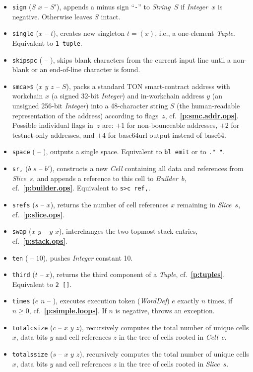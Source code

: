 \documentclass[12pt,oneside]{article}
\def\refpoint#1{{\rm\textbf{\ref{#1}}}}
\let\ptref=\refpoint
\begin{document}
\begin{itemize}
\item {\tt sign} ($S$ $x$ -- $S'$), appends a minus sign ``{\tt -}'' to {\em String\/}~$S$ if {\em Integer\/}~$x$ is negative. Otherwise leaves $S$ intact.
\item {\tt single} ($x$ -- $t$), creates new singleton $t=(x)$, i.e., a one-element {\em Tuple}. Equivalent to {\tt 1 tuple}.
\item {\tt skipspc} ( -- ), skips blank characters from the current input line until a non-blank or an end-of-line character is found.
\item {\tt smca>\$} ($x$ $y$ $z$ -- $S$), packs a standard TON smart-contract address with workchain $x$ (a signed 32-bit {\em Integer\/}) and in-workchain address $y$ (an unsigned 256-bit {\em Integer\/}) into a 48-character string $S$ (the human-readable representation of the address) according to flags~$z$, cf.~\ptref{p:smc.addr.ops}. Possible individual flags in~$z$ are: $+1$ for non-bounceable addresses, $+2$ for testnet-only addresses, and $+4$ for base64url output instead of base64.
\item {\tt space} ( -- ), outputs a single space. Equivalent to {\tt bl emit} or to {\tt ." "}.
\item {\tt sr,} ($b$ $s$ -- $b'$), constructs a new {\em Cell\/} containing all data and references from {\em Slice\/}~$s$, and appends a reference to this cell to {\em Builder}~$b$, cf.~\ptref{p:builder.ops}. Equivalent to {\tt s>c ref,}.
\item {\tt srefs} ($s$ -- $x$), returns the number of cell references $x$ remaining in {\em Slice}~$s$, cf.~\ptref{p:slice.ops}.
\item {\tt swap} ($x$ $y$ -- $y$ $x$), interchanges the two topmost stack entries, cf.~\ptref{p:stack.ops}.
\item {\tt ten} ( -- $10$), pushes {\em Integer\/} constant 10.
\item {\tt third} ($t$ -- $x$), returns the third component of a {\em Tuple}, cf.~\ptref{p:tuples}. Equivalent to {\tt 2 []}.
\item {\tt times} ($e$ $n$ -- ), executes execution token ({\em WordDef\/}) $e$ exactly $n$ times, if $n\geq0$, cf.~\ptref{p:simple.loops}. If $n$ is negative, throws an exception.
\item {\tt totalcsize} ($c$ -- $x$ $y$ $z$), recursively computes the total number of unique cells $x$, data bits $y$ and cell references $z$ in the tree of cells rooted in {\em Cell\/}~$c$.
\item {\tt totalssize} ($s$ -- $x$ $y$ $z$), recursively computes the total number of unique cells $x$, data bits $y$ and cell references $z$ in the tree of cells rooted in {\em Slice\/}~$s$.

\end{itemize}
\end{document}
